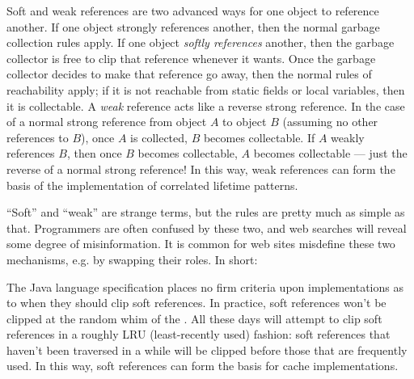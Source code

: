 

Soft and weak references are two advanced ways for one object to reference
another. If one object strongly references another, then the normal garbage
collection rules apply. If one object \emph{softly references} another, then
the garbage collector is free to clip that reference whenever it wants. Once the
garbage collector decides to make that reference go away, then the normal rules
of reachability apply; if it is not reachable from static fields or local
variables, then it is collectable.
A \emph{weak} reference acts like a reverse strong reference. In the case of a
normal strong reference from object $A$ to object $B$ (assuming no other
references to $B$), once $A$ is collected, $B$ becomes collectable. If $A$
weakly references $B$, then once $B$ becomes collectable, $A$ becomes
collectable --- just the reverse of a normal strong reference! In this way, weak
references can form the basis of the implementation of correlated lifetime
patterns.


``Soft'' and ``weak'' are strange terms, but the rules are pretty much as simple
as that. Programmers are often confused by these two, and web searches will
reveal some degree of misinformation. It is common for web sites misdefine
these two mechanisms, e.g. by swapping their roles. In short:

 
The Java language specification places no firm criteria upon \jre
implementations as to when they should clip soft references. In practice, soft
references won't be clipped at the random whim of the \jre. All \jres these days
will attempt to clip soft references in a roughly LRU (least-recently used)
fashion: soft references that haven't been traversed in a while will be clipped
before those that are frequently used. In this way, soft references can form the
basis for cache implementations.

